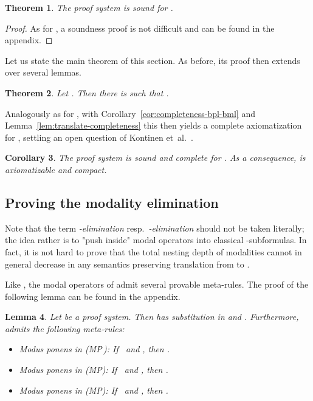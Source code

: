 \documentclass[a4paper,english,fleqn,11pt,final]{scrartcl}
\newcommand{\Deriv}[1]{{\normalfont\textsf{#1}}}
\theoremstyle{plain}
\newtheorem{theorem}{Theorem}[section]
\newtheorem{lemma}[theorem]{Lemma}
\newtheorem{corollary}[theorem]{Corollary}
\theoremstyle{definition}
\begin{document}
\begin{theorem}\label{thm:mtl-completeness}
	The proof system  is sound for .
\end{theorem}
\begin{proof}
As for , a soundness proof is not difficult and can be found in the appendix.
\end{proof}

Let us state the main theorem of this section.
As before, its proof then extends over several lemmas.

\begin{theorem}\label{thm:mtl-is-equiv-to-bml}
Let .
Then there is  such that .
\end{theorem}

Analogously as for , with Corollary~\ref{cor:completeness-bpl-bml} and Lemma~\ref{lem:translate-completeness} this then yields a complete axiomatization for , settling an open question of Kontinen et~al.~\cite{kontinen_van_2014}.

\begin{corollary}\label{cor:mtl-completeness}
The proof system  is sound and complete for .
As a consequence,  is axiomatizable and compact.
\end{corollary}

\subsection{Proving the modality elimination}

Note that the term \emph{-elimination} resp.\ \emph{-elimination} should not be taken literally; the idea rather is to "push inside" modal operators into classical -subformulas.
In fact, it is not hard to prove that the total nesting depth of modalities cannot in general decrease in any semantics preserving translation from  to .

Like , the modal operators of  admit several provable meta-rules.
The proof of the following lemma can be found in the appendix.

\begin{lemma}\label{lem:meta-mtl}
Let  be a proof system.
Then  has substitution in  and .
Furthermore,  admits the following meta-rules:
\begin{itemize}
	\item Modus ponens in  \Deriv{(MP\,)}:
	If \, and , then .
	\item Modus ponens in  \Deriv{(MP)}:
	If \, and , then .
	\item Modus ponens in  \Deriv{(MP)}:
	If \, and , then .
\end{itemize}
\end{lemma}
\end{document}
